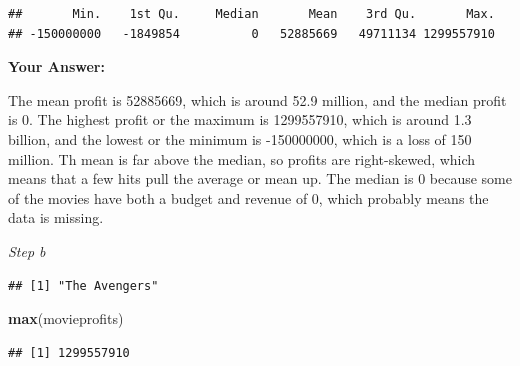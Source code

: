 \documentclass[
]{article}
\newenvironment{Shaded}{\begin{snugshade}}{\end{snugshade}}
\newcommand{\FunctionTok}[1]{\textcolor[rgb]{0.13,0.29,0.53}{\textbf{#1}}}
\newcommand{\NormalTok}[1]{#1}
\newcommand{\OtherTok}[1]{\textcolor[rgb]{0.56,0.35,0.01}{#1}}
\newcommand{\SpecialCharTok}[1]{\textcolor[rgb]{0.81,0.36,0.00}{\textbf{#1}}}
\begin{document}
\begin{verbatim}
##       Min.    1st Qu.     Median       Mean    3rd Qu.       Max. 
## -150000000   -1849854          0   52885669   49711134 1299557910
\end{verbatim}

\textbf{Your Answer:}

The mean profit is 52885669, which is around 52.9 million, and the
median profit is 0. The highest profit or the maximum is 1299557910,
which is around 1.3 billion, and the lowest or the minimum is
-150000000, which is a loss of 150 million. Th mean is far above the
median, so profits are right-skewed, which means that a few hits pull
the average or mean up. The median is 0 because some of the movies have
both a budget and revenue of 0, which probably means the data is
missing.

\emph{Step b}

\begin{Shaded}
\end{Shaded}

\begin{verbatim}
## [1] "The Avengers"
\end{verbatim}

\begin{Shaded}
\begin{Highlighting}[]
\FunctionTok{max}\NormalTok{(movieprofits)}
\end{Highlighting}
\end{Shaded}

\begin{verbatim}
## [1] 1299557910
\end{verbatim}

\begin{Shaded}
\end{Shaded}
\end{document}
